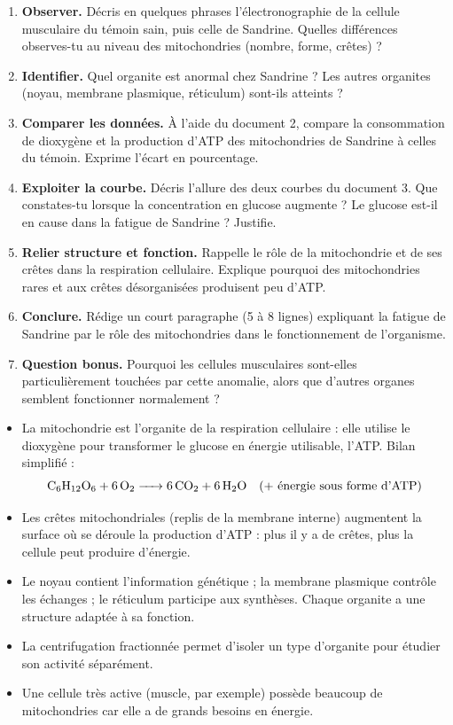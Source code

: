 \documentclass[11pt]{article}
\newcommand{\cle}[1]{{\popxbold\color{popdark}#1}}
\newcounter{popsec}
\newcounter{popsub}
\newcommand{\courssub}[1]{%
  \stepcounter{popsub}%
  \par\vspace{9pt}\noindent{\popxbold\fontsize{11.5}{13}\selectfont\color{popink}{\color{poporange}\thepopsec.\thepopsub}\hspace{6pt}#1}\par\nopagebreak\vspace{4pt}
}
\begin{document}
\begin{enumerate}
\item \textbf{Observer.} Décris en quelques phrases l'électronographie de la cellule musculaire du témoin sain, puis celle de Sandrine. Quelles différences observes-tu au niveau des mitochondries (nombre, forme, crêtes) ?
\item \textbf{Identifier.} Quel organite est anormal chez Sandrine ? Les autres organites (noyau, membrane plasmique, réticulum) sont-ils atteints ?
\item \textbf{Comparer les données.} À l'aide du document 2, compare la consommation de dioxygène et la production d'ATP des mitochondries de Sandrine à celles du témoin. Exprime l'écart en pourcentage.
\item \textbf{Exploiter la courbe.} Décris l'allure des deux courbes du document 3. Que constates-tu lorsque la concentration en glucose augmente ? Le glucose est-il en cause dans la fatigue de Sandrine ? Justifie.
\item \textbf{Relier structure et fonction.} Rappelle le rôle de la mitochondrie et de ses crêtes dans la respiration cellulaire. Explique pourquoi des mitochondries rares et aux crêtes désorganisées produisent peu d'ATP.
\item \textbf{Conclure.} Rédige un court paragraphe (5 à 8 lignes) expliquant la fatigue de Sandrine par le rôle des mitochondries dans le fonctionnement de l'organisme.
\item \textbf{Question bonus.} Pourquoi les cellules musculaires sont-elles particulièrement touchées par cette anomalie, alors que d'autres organes semblent fonctionner normalement ?
\end{enumerate}

\courssub{Ressources à mobiliser}

\begin{aretenir}
\begin{itemize}
\item La \cle{mitochondrie} est l'organite de la \cle{respiration cellulaire} : elle utilise le dioxygène pour transformer le glucose en énergie utilisable, l'\cle{ATP}. Bilan simplifié :
\[ \ce{C6H12O6 + 6O2 -> 6CO2 + 6H2O} \quad \text{(+ énergie sous forme d'ATP)} \]
\item Les \cle{crêtes mitochondriales} (replis de la membrane interne) augmentent la surface où se déroule la production d'ATP : plus il y a de crêtes, plus la cellule peut produire d'énergie.
\item Le \cle{noyau} contient l'information génétique ; la \cle{membrane plasmique} contrôle les échanges ; le \cle{réticulum} participe aux synthèses. Chaque organite a une structure adaptée à sa fonction.
\item La \cle{centrifugation fractionnée} permet d'isoler un type d'organite pour étudier son activité séparément.
\item Une cellule très active (muscle, par exemple) possède beaucoup de mitochondries car elle a de grands besoins en énergie.
\end{itemize}
\end{aretenir}
\end{document}
